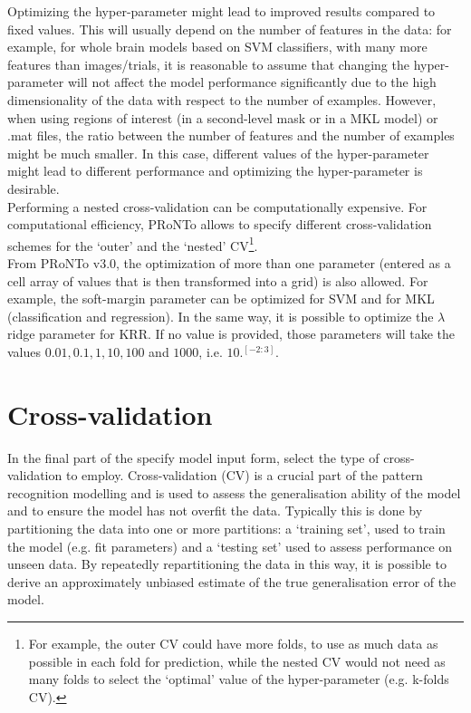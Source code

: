 Optimizing the hyper-parameter might lead to improved results compared to fixed values. This will usually depend on the number of features in the data: for example, for whole brain models based on SVM classifiers, with many more features than images/trials, it is reasonable to assume that changing the hyper-parameter will not affect the model performance significantly due to the high dimensionality of the data with respect to the number of examples. However, when using regions of interest (in a second-level mask or in a MKL model) or .mat files, the ratio between the number of features and the number of examples might be much smaller. In this case, different values of the hyper-parameter might lead to different performance and optimizing the hyper-parameter is desirable.
\\

Performing a nested cross-validation can be computationally expensive. For computational efficiency, PRoNTo allows to specify different cross-validation schemes for the `outer' and the `nested' CV\footnote{For example, the outer CV could have more folds, to use as much data as possible in each fold for prediction, while the nested CV would not need as many folds to select the `optimal' value of the hyper-parameter (e.g. k-folds CV).}. 
\\[1cm]

From PRoNTo v3.0, the optimization of more than one parameter (entered as a cell array of values that is then transformed into a grid) is also allowed. For example, the soft-margin parameter can be optimized for SVM and for MKL (classification and regression). In the same way, it is possible to optimize the $\lambda$ ridge parameter for KRR. If no value is provided, those parameters will take the values $0.01, 0.1, 1, 10, 100$ and $1000$, i.e. $10.^{[-2:3]}$.

\section{Cross-validation}
\label{sec:cross_val}

In the final part of the specify model input form, select the type of cross-validation to employ. Cross-validation (CV) is a crucial part of the pattern recognition modelling and is used to assess the generalisation ability of the model and to ensure the model has not overfit the data. Typically this is done by partitioning the data into one or more partitions: a `training set', used to train the model (e.g. fit parameters) and a `testing set' used to assess performance on unseen data. By repeatedly repartitioning the data in this way, it is possible to derive an approximately unbiased estimate of the true generalisation error of the model. 
\\

